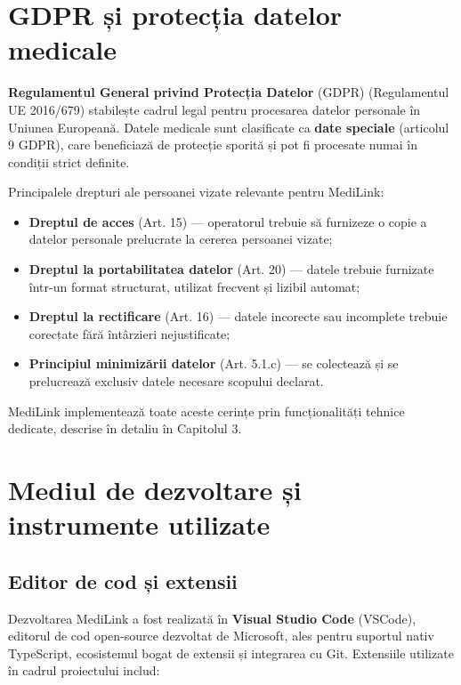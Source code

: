 \section{GDPR și protecția datelor medicale}

\textbf{Regulamentul General privind Protecția Datelor} (GDPR) \cite{gdpr2016} (Regulamentul UE 2016/679) stabilește cadrul legal pentru procesarea datelor personale în Uniunea Europeană. Datele medicale sunt clasificate ca \textbf{date speciale} (articolul 9 GDPR), care beneficiază de protecție sporită și pot fi procesate numai în condiții strict definite.

Principalele drepturi ale persoanei vizate relevante pentru MediLink:
\begin{itemize}
  \item \textbf{Dreptul de acces} (Art. 15) --- operatorul trebuie să furnizeze o copie a datelor personale prelucrate la cererea persoanei vizate;
  \item \textbf{Dreptul la portabilitatea datelor} (Art. 20) --- datele trebuie furnizate într-un format structurat, utilizat frecvent și lizibil automat;
  \item \textbf{Dreptul la rectificare} (Art. 16) --- datele incorecte sau incomplete trebuie corectate fără întârzieri nejustificate;
  \item \textbf{Principiul minimizării datelor} (Art. 5.1.c) --- se colectează și se prelucrează exclusiv datele necesare scopului declarat.
\end{itemize}

MediLink implementează toate aceste cerințe prin funcționalități tehnice dedicate, descrise în detaliu în Capitolul 3.

\section{Mediul de dezvoltare și instrumente utilizate}

\subsection{Editor de cod și extensii}

Dezvoltarea MediLink a fost realizată în \textbf{Visual Studio Code} (VSCode), editorul de cod open-source dezvoltat de Microsoft, ales pentru suportul nativ TypeScript, ecosistemul bogat de extensii și integrarea cu Git. Extensiile utilizate în cadrul proiectului includ:

